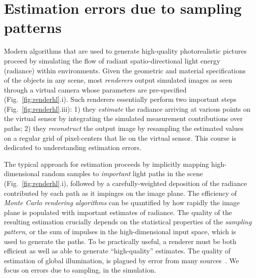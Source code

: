 \documentclass{acmsiggraph}
\begin{document}
%
%


\keywordlist


\printcopyright

\section{Estimation errors due to sampling patterns}
Modern algorithms that are used to generate high-quality photorealistic pictures proceed by simulating the flow of radiant spatio-directional light energy (radiance) within environments. Given the geometric and material specifications of the objects in any scene, most \textit{renderers} output simulated images as seen through a virtual camera whose parameters are pre-specified (Fig.~\ref{fig:renderhl}.i). Such renderers essentially perform two important steps (Fig.~\ref{fig:renderhl}.iii): 1) they \textit{estimate} the radiance arriving at various points on the virtual sensor by integrating the simulated measurement contributions over paths; 2) they \textit{reconstruct} the output image by resampling the estimated values on a regular grid of pixel-centers that lie on the virtual sensor. This course is dedicated to understanding estimation errors.

The typical approach for estimation proceeds by implicitly mapping high-dimensional random samples to \textit{important} light paths in the scene (Fig.~\ref{fig:renderhl}.i), followed by a carefully-weighted deposition of the radiance contributed by each path as it impinges on the image plane. The efficiency of \textit {Monte Carlo rendering algorithms} can be quantified by how rapidly the image plane is populated with important estimates of radiance. The quality of the resulting estimation crucially depends on the statistical properties of the \textit {sampling pattern}, or the sum of impulses in the high-dimensional input space, which is used to generate the paths. To be practically useful, a renderer must be both efficient as well as able to generate ``high-quality'' estimates. The quality of estimation of global illumination, is plagued by error from many sources~\cite{arvo1994framework}. We focus on errors due to sampling, in the simulation.
\end{document}
